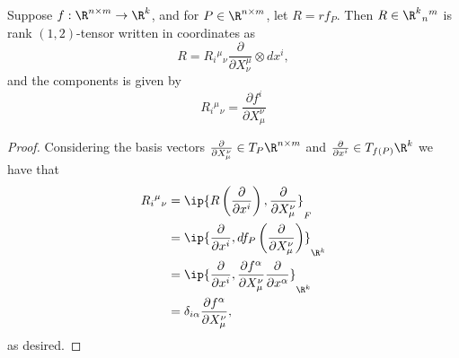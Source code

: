 \begin{lem}
	Suppose $f:\R^{n\times m}\to\R^k$, and for $P\in\R^{n\times m}$, let $R=rf_P$.  Then $R\in\R^k{_n}{^m}$ is rank $(1,2)$-tensor written in coordinates as
	$$R=R_i{^\mu}{_\nu}\frac{\partial}{\partial X^\mu_\nu}\otimes dx^i,$$
	and the components is given by
	$$R_i{^\mu}{_\nu}=\frac{\partial f^i}{\partial X^\nu_\mu}$$
\end{lem}

\begin{proof}
	Considering the basis vectors $\frac{\partial}{\partial X^\nu_\mu}\in T_P\R^{n\times m}$ and $\frac{\partial}{\partial x^i}\in T_{f(P)}\R^k$ we have that
	\begin{align*}
		R_i{^\mu}{_\nu}&=\ip{R\left(\frac{\partial}{\partial x^i}\right), \frac{\partial}{\partial X^\nu_\mu}}_F\\
		&=\ip{\frac{\partial}{\partial x^i},df_P\left(\frac{\partial}{\partial X^\nu_\mu}\right)}_{\R^k}\\
		&=\ip{\frac{\partial}{\partial x^i},\frac{\partial f^\alpha}{\partial X^\nu_\mu}\frac{\partial}{\partial x^\alpha}}_{\R^k}\\
		&=\delta_{i\alpha}\frac{\partial f^\alpha}{\partial X^\nu_\mu},
	\end{align*}
	as desired.
\end{proof}





